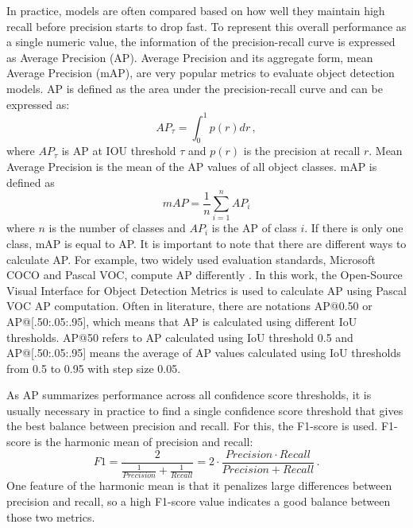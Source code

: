 In practice, models are often compared based on how well they maintain high recall before precision starts to drop fast. To represent this overall performance as a single numeric value, the information of the precision-recall curve is expressed as Average Precision (AP). Average Precision and its aggregate form, mean Average Precision (mAP), are very popular metrics to evaluate object detection models. AP is defined as the area under the precision-recall curve and can be expressed as:
\begin{equation}
    AP_{\tau} = \int_{0}^{1} p(r) dr \,,
\end{equation}
where $AP_{\tau}$ is AP at IOU threshold $\tau$ and $p(r)$ is the precision at recall $r$. \cite{Terven_2025} Mean Average Precision is the mean of the AP values of all object classes. mAP is defined as
\begin{equation}
    mAP = \frac{1}{n} \sum_{i=1}^{n} AP_i
\end{equation}
where $n$ is the number of classes and $AP_i$ is the AP of class $i$. \cite{performancesurvey} If there is only one class, mAP is equal to AP. It is important to note that there are different ways to calculate AP. For example, two widely used evaluation standards, Microsoft COCO and Pascal VOC, compute AP differently \cite{Terven_2025}. In this work, the Open-Source Visual Interface for Object Detection Metrics \cite{electronics10030279} is used to calculate AP using Pascal VOC AP computation. Often in literature, there are notations AP@0.50 or AP@[.50:.05:.95], which means that AP is calculated using different IoU thresholds. AP@50 refers to AP calculated using IoU threshold 0.5 and AP@[.50:.05:.95] means the average of AP values calculated using IoU thresholds from 0.5 to 0.95 with step size 0.05. \cite{Terven_2025}

As AP summarizes performance across all confidence score thresholds, it is usually necessary in practice to find a single confidence score threshold that gives the best balance between precision and recall. For this, the F1-score is used. F1-score is the harmonic mean of precision and recall:
\begin{equation}
    F1 = \frac{2}{\frac{1}{Precision} + \frac{1}{Recall}} = 2 \cdot \frac{Precision \cdot Recall}{Precision + Recall} \,.
    \label{eq:f1}
\end{equation}
One feature of the harmonic mean is that it penalizes large differences between precision and recall, so a high F1-score value indicates a good balance between those two metrics. \cite{Terven_2025}

